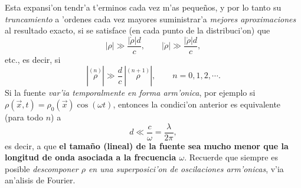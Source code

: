Esta expansi'on tendr'a t'erminos cada vez m'as peque\~nos, y por lo tanto su \textit{truncamiento} a 'ordenes cada vez mayores suministrar'a \textit{mejores aproximaciones} al resultado exacto, si se satisface (en cada punto de la distribuci'on) que
\begin{equation}
 |\rho|\gg \frac{|\dot{\rho}|d}{c}, \qquad  |\dot{\rho}|\gg \frac{|\ddot{\rho}|d}{c},
\end{equation}
etc., es decir, si
\begin{equation}
|\stackrel{(n)}{\rho}|\gg \frac{d}{c}\,|\stackrel{(n+1)}{\rho}|, \qquad n=0,1,2,\cdots .
\end{equation}
Si la fuente \textit{var'ia temporalmente en forma arm'onica}, por ejemplo si $\rho(\vec{x},t)=\rho_0(\vec{x})\cos(\omega t)$, entonces la condici'on anterior es equivalente (para todo $n$) a
\begin{equation}
d\ll\frac{c}{\omega}=\frac{\lambda}{2\pi},
\end{equation}
es decir, a que \textbf{el tama\~no (lineal) de la fuente sea mucho menor que la longitud de onda asociada a la frecuencia $\omega$}. Recuerde que siempre es posible \textit{descomponer $\rho$ en una superposici'on de oscilaciones arm'onicas}, v'ia an'alisis de Fourier.

